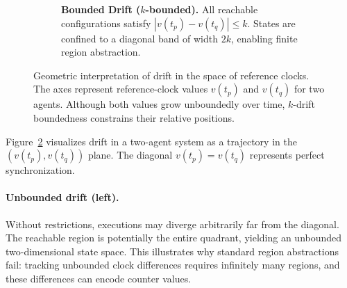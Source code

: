 \begin{figure}[t]
\begin{subfigure}[b]{0.45\textwidth}
{
        }
        \caption{\textbf{Bounded Drift ($k$-bounded).} All reachable configurations satisfy $|v(t_p) - v(t_q)| \le k$. States are confined to a diagonal band of width $2k$, enabling finite region abstraction.}
        \label{fig:drift_bounded}
    \end{subfigure}
    
    \caption{Geometric interpretation of drift in the space of reference clocks. The axes represent reference-clock values $v(t_p)$ and $v(t_q)$ for two agents. Although both values grow unboundedly over time, $k$-drift boundedness constrains their relative positions.}
    \label{fig:drift_comparison}
\end{figure}

Figure~\ref{fig:drift_comparison} visualizes drift in a two-agent system as a trajectory in the $(v(t_p), v(t_q))$ plane. The diagonal $v(t_p) = v(t_q)$ represents perfect synchronization.

\paragraph{Unbounded drift (left).} Without restrictions, executions may diverge arbitrarily far from the diagonal. The reachable region is potentially the entire quadrant, yielding an unbounded two-dimensional state space. This illustrates why standard region abstractions fail: tracking unbounded clock differences requires infinitely many regions, and these differences can encode counter values.

